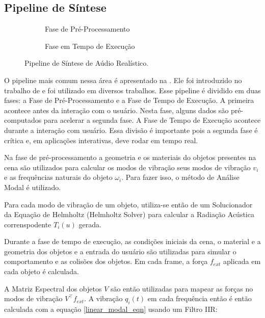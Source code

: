 \subsection{Pipeline de Síntese}

\begin{figure}[ht]
\begin{subfigure}{\textwidth}
	\centering
	
	\caption{Fase de Pré-Processamento}\label{pipeline_offline}
\end{subfigure}
\begin{subfigure}{\textwidth}
	\centering
	
	\caption{Fase em Tempo de Execução}\label{pipeline_online}
\end{subfigure}
\caption[Pipeline de Síntese de Aúdio Realístico]{Pipeline de Síntese de Aúdio Realístico.}
\label{fig:pipeline_overview}
\end{figure}

O pipeline mais comum nessa área é apresentado na . Ele foi introduzido no trabalho de \cite{james2006precomputed} e foi utilizado em diversos trabalhos. Esse pipeline é dividido em duas fases: a Fase de Pré-Processamento e a Fase de Tempo de Execução. A primeira acontece antes da interação com o usuário. Nesta fase, alguns dados são pré-computados para acelerar a segunda fase. A Fase de Tempo de Execução acontece durante a interação com usuário. Essa divisão é importante pois a segunda fase é crítica e, em aplicações interativas, deve rodar em tempo real.

Na fase de pré-processamento a geometria e os materiais do objetos presentes na cena são utilizados para calcular os modos de vibração seus modos de vibração $v_i$ e as frequências naturais do objeto $\omega_i$. Para fazer isso, o método de Análise Modal é utilizado.

Para cada modo de vibração de um objeto, utiliza-se então de um Solucionador da Equação de Helmholtz (Helmholtz Solver) para calcular a Radiação Acústica correnspodente $T_i(u)$ gerada.

Durante a fase de tempo de execução, as condições iniciais da cena, o material e a geometria dos objetos e a entrada do usuário são utilizadas para simular o comportamento e as colisões dos objetos. Em cada frame, a força $f_{ext}$ aplicada em cada objeto é calculada.

A Matriz Espectral dos objetos $V$ são então utilizadas para mapear as forças no modos de vibração $V^\intercal f_{ext}$. A vibração $q_i(t)$ em cada frequência então é então calculada com a equação \eqref{linear_modal_eqn} usando um Filtro IIR:

